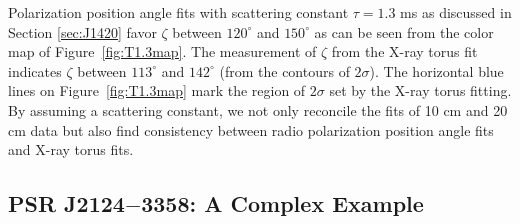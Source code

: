 Polarization position angle fits with scattering constant $\tau=1.3$ ms as 
discussed in Section \ref{sec:J1420} favor $\zeta$ between $120^\circ$ and $150^\circ$
as can be seen from the color map of Figure~\ref{fig:T1.3map}.  
The measurement of $\zeta$ from the 
X-ray torus fit indicates $\zeta$ between $113^\circ$ 
and $142^\circ$ (from the contours of $2\sigma$).  
The horizontal blue lines on Figure~\ref{fig:T1.3map} 
mark the region of $2\sigma$ set by the X-ray 
torus fitting.  By assuming a
scattering constant, we not only reconcile the fits of 10 cm and 20 cm data but also 
find consistency between radio polarization position angle fits and X-ray torus fits. 

\subsection{PSR J2124$-$3358: A Complex Example}
\label{sec:J2124}

\begin{table}[t]
\tabcolsep=0.1cm
\caption{Fit Parameters for PSR J2124$-$3358}
\begin{center}
\def\arraystretch{1.5}
\label{tb:fitJ2124} 
\end{center} 
\end{table}




